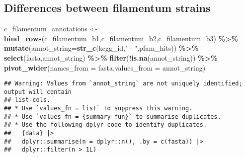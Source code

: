 \documentclass[
]{article}
\newenvironment{Shaded}{\begin{snugshade}}{\end{snugshade}}
\newcommand{\AttributeTok}[1]{\textcolor[rgb]{0.13,0.29,0.53}{#1}}
\newcommand{\FunctionTok}[1]{\textcolor[rgb]{0.13,0.29,0.53}{\textbf{#1}}}
\newcommand{\NormalTok}[1]{#1}
\newcommand{\OtherTok}[1]{\textcolor[rgb]{0.56,0.35,0.01}{#1}}
\newcommand{\SpecialCharTok}[1]{\textcolor[rgb]{0.81,0.36,0.00}{\textbf{#1}}}
\newcommand{\StringTok}[1]{\textcolor[rgb]{0.31,0.60,0.02}{#1}}
\begin{document}
\hypertarget{differences-between-filamentum-strains}{%
\subsection{Differences between filamentum
strains}\label{differences-between-filamentum-strains}}

\begin{Shaded}
\begin{Highlighting}[]
\NormalTok{c\_filamentum\_annotations }\OtherTok{\textless{}{-}} \FunctionTok{bind\_rows}\NormalTok{(c\_filamentum\_b1,c\_filamentum\_b2,c\_filamentum\_b3) }\SpecialCharTok{\%\textgreater{}\%} 
  \FunctionTok{mutate}\NormalTok{(}\AttributeTok{annot\_string=}\FunctionTok{str\_c}\NormalTok{(kegg\_id,}\StringTok{" {-} "}\NormalTok{,pfam\_hits)) }\SpecialCharTok{\%\textgreater{}\%} 
  \FunctionTok{select}\NormalTok{(fasta,annot\_string) }\SpecialCharTok{\%\textgreater{}\%}
  \FunctionTok{filter}\NormalTok{(}\SpecialCharTok{!}\FunctionTok{is.na}\NormalTok{(annot\_string)) }\SpecialCharTok{\%\textgreater{}\%}
  \FunctionTok{pivot\_wider}\NormalTok{(}\AttributeTok{names\_from =}\NormalTok{ fasta,}\AttributeTok{values\_from =}\NormalTok{ annot\_string)}
\end{Highlighting}
\end{Shaded}

\begin{verbatim}
## Warning: Values from `annot_string` are not uniquely identified; output will contain
## list-cols.
## * Use `values_fn = list` to suppress this warning.
## * Use `values_fn = {summary_fun}` to summarise duplicates.
## * Use the following dplyr code to identify duplicates.
##   {data} |>
##   dplyr::summarise(n = dplyr::n(), .by = c(fasta)) |>
##   dplyr::filter(n > 1L)
\end{verbatim}
\end{document}
